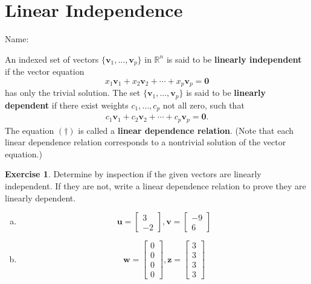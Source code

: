 \documentclass[10pt]{book}
\newcommand{\boxcolor}{gray!30}
\newenvironment{boxdef}{\begin{mdframed}[backgroundcolor=\boxcolor,linewidth=0pt,nobreak=true]}{\end{mdframed}}
\theoremstyle{definition}
\newtheorem{exercise}{Exercise}[section]
\newcommand{\name}[1][2.5in]{\vspace{-2.3em}\hfill Name: \underline{\hspace{#1}}}
\newcommand{\R}{\mathbb{R}}
\newcommand{\vect}[1]{\ensuremath{\boldsymbol{\mathbf{#1}}}}
\begin{document}
\newpage


\section{Linear Independence}
\name

\begin{boxdef}
	An indexed set of vectors $\{\vect{v}_1,\ldots,\vect{v}_p\}$ in $\R^n$ is said to be \textbf{linearly independent} if the vector equation
	$$ x_1\vect{v}_1 + x_2\vect{v}_2 + \cdots + x_p\vect{v}_p = \vect{0} $$
	has only the trivial solution. The set $\{\vect{v}_1,\ldots,\vect{v}_p\}$ is said to be \textbf{linearly dependent} if there exist weights $c_1,\ldots,c_p$ not all zero, such that
	\begin{align*}
	c_1\vect{v}_1 + c_2\vect{v}_2 + \cdots + c_p\vect{v}_p = \vect{0}. \tag{\dag}
	\end{align*}
	The equation $(\dag)$ is called a \textbf{linear dependence relation}. (Note that each linear dependence relation corresponds to a nontrivial solution of the vector equation.)
\end{boxdef}

\begin{exercise} %
	Determine by inspection if the given vectors are linearly independent. If they are not, write a linear dependence relation to prove they are linearly dependent.
	\begin{multicols}{2}
		\begin{enumerate}[(a)]
			\item $$\vect{u}=\begin{bmatrix}3\\-2\end{bmatrix}, \vect{v}=\begin{bmatrix}-9\\6\end{bmatrix}$$
			\item $$\vect{w}=\begin{bmatrix}0\\0\\0\\0\end{bmatrix}, \vect{z}=\begin{bmatrix}3\\3\\3\\3\end{bmatrix}$$
		\end{enumerate}
	\end{multicols}
\end{exercise}
\vfill
\end{document}
